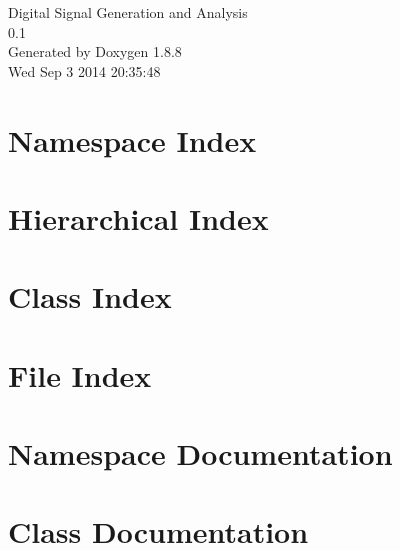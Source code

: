 \documentclass[twoside]{book}
\newcommand{\+}{\discretionary{\mbox{\scriptsize$\hookleftarrow$}}{}{}}
\newcommand{\clearemptydoublepage}{%
  \newpage{\pagestyle{empty}\cleardoublepage}%
}
\begin{document}
\hypersetup{pageanchor=false,
             bookmarks=true,
             bookmarksnumbered=true,
             pdfencoding=unicode
            }
\begin{titlepage}
\vspace*{7cm}
\begin{center}%
{\Large Digital Signal Generation and Analysis \\[1ex]\large 0.\+1 }\\
\vspace*{1cm}
{\large Generated by Doxygen 1.8.8}\\
\vspace*{0.5cm}
{\small Wed Sep 3 2014 20:35:48}\\
\end{center}
\end{titlepage}
\clearemptydoublepage
\tableofcontents
\clearemptydoublepage
{}
\hypersetup{pageanchor=true}

\chapter{Namespace Index}

\chapter{Hierarchical Index}

\chapter{Class Index}

\chapter{File Index}

\chapter{Namespace Documentation}



\chapter{Class Documentation}





















\end{document}
